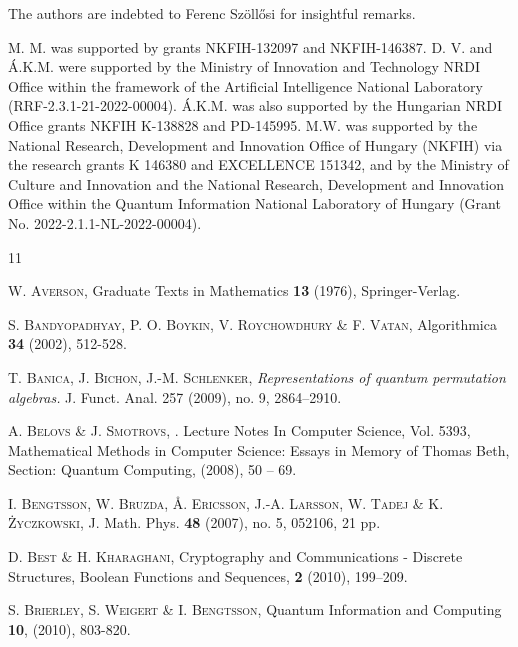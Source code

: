 \documentclass[12pt]{amsart}
\numberwithin{equation}{section}
\theoremstyle{definition}
\theoremstyle{remark}
\theoremstyle{remark}
\begin{document}
The authors are indebted to Ferenc Sz\"oll\H osi for insightful remarks. 

M. M. was supported by grants NKFIH-132097 and NKFIH-146387. D. V. and Á.K.M. were  supported by the
Ministry of Innovation and Technology NRDI Office within the framework of the Artificial
Intelligence National Laboratory (RRF-2.3.1-21-2022-00004). Á.K.M. was also supported by the Hungarian NRDI Office grants NKFIH K-138828 and PD-145995. 
M.W. was supported by the National Research, Development and Innovation Office of Hungary (NKFIH) via the research grants K 146380 and EXCELLENCE 151342, and by the Ministry of Culture and Innovation and the National Research, Development and Innovation Office within the Quantum Information National Laboratory of Hungary (Grant No. 2022-2.1.1-NL-2022-00004).

\begin{thebibliography}{11}

\textsc{W. Averson},
 Graduate Texts in Mathematics {\bf 13} (1976), Springer-Verlag.


\textsc{S. Bandyopadhyay, P. O. Boykin, V. Roychowdhury \& F. Vatan},
 Algorithmica {\bf 34} (2002), 512-528.


\textsc{T. Banica, J. Bichon, J.-M. Schlenker}, {\em Representations of quantum permutation algebras.} J. Funct. Anal. 257 (2009), no. 9, 2864--2910.

\textsc{A. Belovs \& J. Smotrovs},
.
Lecture Notes In Computer Science, Vol. 5393,
Mathematical Methods in Computer Science: Essays in Memory of Thomas Beth,
Section: Quantum Computing, (2008), 50 -- 69.


\textsc{I. Bengtsson, W. Bruzda, \AA. Ericsson, J.-A. Larsson, W.
Tadej \& K. \.Zyczkowski},
J. Math. Phys. {\bf 48} (2007), no. 5, 052106, 21 pp.

\textsc{D. Best \& H. Kharaghani},
Cryptography and Communications - Discrete Structures, Boolean Functions and Sequences, {\bf 2} (2010), 199--209.


\textsc{S. Brierley, S. Weigert \& I. Bengtsson},
Quantum Information and Computing {\bf 10}, (2010), 803-820.


\end{thebibliography}
\end{document}
